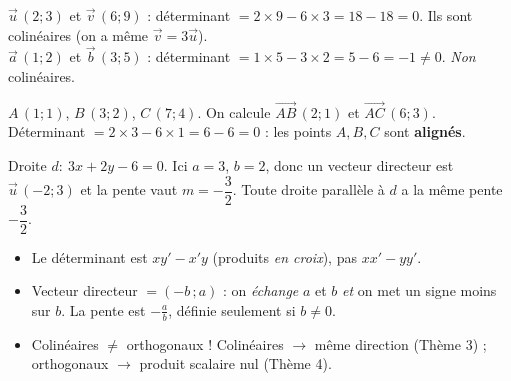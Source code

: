 \documentclass[11pt,a4paper]{article}
\newcommand{\vc}[1]{\overrightarrow{#1}}
\begin{document}
\begin{exemple}
$\vec u\,(2;3)$ et $\vec v\,(6;9)$ : déterminant $=2\times9-6\times3=18-18=0$. Ils sont colinéaires
(on a même $\vec v=3\vec u$).\\
$\vec a\,(1;2)$ et $\vec b\,(3;5)$ : déterminant $=1\times5-3\times2=5-6=-1\neq0$. \emph{Non} colinéaires.
\end{exemple}

\begin{exemple}
$A\,(1;1)$, $B\,(3;2)$, $C\,(7;4)$. On calcule $\vc{AB}\,(2;1)$ et $\vc{AC}\,(6;3)$.
Déterminant $=2\times3-6\times1=6-6=0$ : les points $A,B,C$ sont \textbf{alignés}.
\end{exemple}

\begin{exemple}
Droite $d:\ 3x+2y-6=0$. Ici $a=3$, $b=2$, donc un vecteur directeur est $\vec u\,(-2;3)$ et la
pente vaut $m=-\dfrac{3}{2}$. Toute droite parallèle à $d$ a la même pente $-\dfrac32$.
\end{exemple}

\begin{piege}
\begin{itemize}[leftmargin=1.5em,topsep=2pt,itemsep=1pt]
  \item Le déterminant est $xy'-x'y$ (produits \emph{en croix}), pas $xx'-yy'$.
  \item Vecteur directeur $=(-b\,;a)$ : on \emph{échange} $a$ et $b$ \emph{et} on met un signe moins
        sur $b$. La pente est $-\frac{a}{b}$, définie seulement si $b\neq0$.
  \item Colinéaires $\neq$ orthogonaux ! Colinéaires $\to$ même direction (Thème 3) ;
        orthogonaux $\to$ produit scalaire nul (Thème 4).
\end{itemize}
\end{piege}
\end{document}

